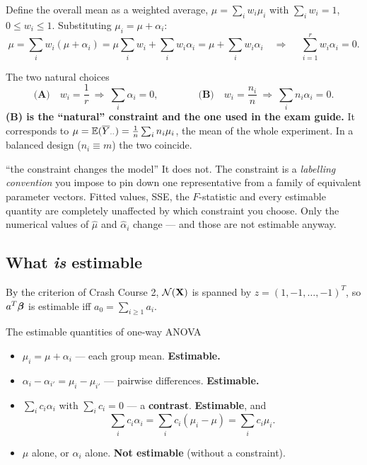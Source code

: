 \documentclass[11pt]{article}
\begin{document}
Define the overall mean as a weighted average, $\mu=\sum_i w_i\mu_i$ with $\sum_i w_i=1$,
$0\le w_i\le 1$. Substituting $\mu_i=\mu+\alpha_i$:
\[
  \mu=\sum_i w_i(\mu+\alpha_i)=\mu\sum_i w_i+\sum_i w_i\alpha_i=\mu+\sum_i w_i\alpha_i
  \quad\Longrightarrow\quad \boxed{\ \sum_{i=1}^r w_i\alpha_i=0 .}
\]

\begin{recipe}{The two natural choices}
\[
  \textbf{(A)}\quad w_i=\frac1r \ \Rightarrow\ \sum_i \alpha_i = 0,
  \qquad\qquad
  \textbf{(B)}\quad w_i=\frac{n_i}{n}\ \Rightarrow\ \sum_i n_i\alpha_i = 0 .
\]
\textbf{(B) is the ``natural'' constraint and the one used in the exam guide.} It corresponds
to $\mu=\mathbb{E}(\overline{Y}_{\cdot\cdot})=\frac1n\sum_i n_i\mu_i$, the mean of the whole experiment. In a
balanced design ($n_i\equiv m$) the two coincide.
\end{recipe}

\begin{confusion}{``the constraint changes the model''}
It does not. The constraint is a \emph{labelling convention} you impose to pin down one
representative from a family of equivalent parameter vectors. Fitted values, SSE, the
$F$-statistic and every estimable quantity are completely unaffected by which constraint you
choose. Only the numerical values of $\hat\mu$ and $\hat\alpha_i$ change --- and those are
not estimable anyway.
\end{confusion}

\subsection{What \emph{is} estimable}

By the criterion of Crash Course 2, $\mathcal{N}(\mathbf{X})$ is spanned by $z=(1,-1,\dots,-1)^T$, so
$a^T\boldsymbol{\beta}$ is estimable iff $a_0=\sum_{i\ge1}a_i$.

\begin{idea}{The estimable quantities of one-way ANOVA}
\begin{itemize}
  \item $\mu_i=\mu+\alpha_i$ \quad --- each group mean. \textbf{Estimable.}
  \item $\alpha_i-\alpha_{i'}=\mu_i-\mu_{i'}$ \quad --- pairwise differences. \textbf{Estimable.}
  \item $\sum_i c_i\alpha_i$ with $\sum_i c_i=0$ \quad --- a \textbf{contrast}. \textbf{Estimable}, and
        \[
          \sum_i c_i\alpha_i=\sum_i c_i(\mu_i-\mu)=\sum_i c_i\mu_i .
        \]
  \item $\mu$ alone, or $\alpha_i$ alone. \textbf{Not estimable} (without a constraint).
\end{itemize}
\end{idea}
\end{document}
